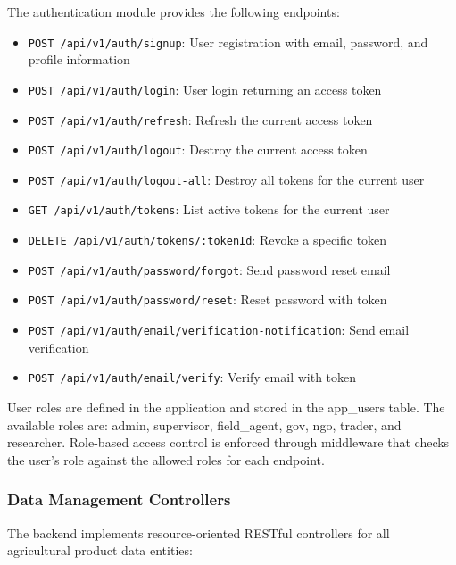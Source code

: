 The authentication module provides the following endpoints:
\begin{itemize}
  \item \texttt{POST /api/v1/auth/signup}: User registration with email, password, and profile information
  \item \texttt{POST /api/v1/auth/login}: User login returning an access token
  \item \texttt{POST /api/v1/auth/refresh}: Refresh the current access token
  \item \texttt{POST /api/v1/auth/logout}: Destroy the current access token
  \item \texttt{POST /api/v1/auth/logout-all}: Destroy all tokens for the current user
  \item \texttt{GET /api/v1/auth/tokens}: List active tokens for the current user
  \item \texttt{DELETE /api/v1/auth/tokens/:tokenId}: Revoke a specific token
  \item \texttt{POST /api/v1/auth/password/forgot}: Send password reset email
  \item \texttt{POST /api/v1/auth/password/reset}: Reset password with token
  \item \texttt{POST /api/v1/auth/email/verification-notification}: Send email verification
  \item \texttt{POST /api/v1/auth/email/verify}: Verify email with token
\end{itemize}

User roles are defined in the application and stored in the app\_users table. The available roles are: admin, supervisor, field\_agent, gov, ngo, trader, and researcher. Role-based access control is enforced through middleware that checks the user's role against the allowed roles for each endpoint.

\subsubsection{Data Management Controllers}

The backend implements resource-oriented RESTful controllers for all agricultural product data entities:

